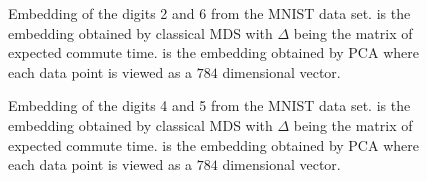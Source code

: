 \begin{figure}[htbp]
  \begin{center}
  \caption{Embedding of the digits 2 and 6 from the MNIST data
    set.  is the embedding obtained by
    classical MDS with $\Delta$ being the matrix of expected commute
    time.  is the embedding obtained by
    PCA where each data point is viewed as a $784$ dimensional vector.
    }
  \label{fig:mnist26}
  \end{center}
\end{figure}    

\begin{figure}[htbp]
  \begin{center}
  \caption{Embedding of the digits 4 and 5 from the MNIST data
    set.  is the embedding obtained by
    classical MDS with $\Delta$ being the matrix of expected commute
    time.  is the embedding obtained by
    PCA where each data point is viewed as a $784$ dimensional vector.
    }
  \label{fig:mnist45}
  \end{center}
\end{figure}    

